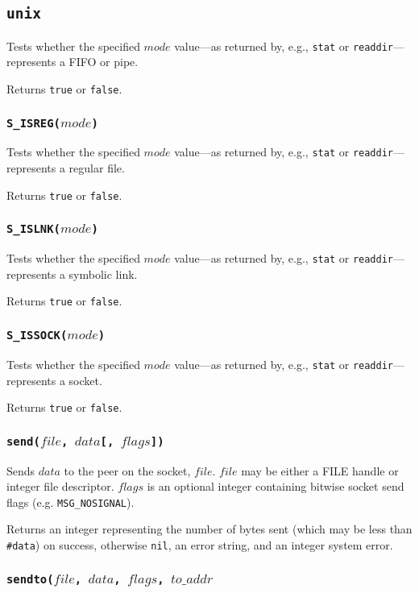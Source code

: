 \documentclass[11pt, oneside]{memoir}
\newcommand*{\true}[0]{\texttt{true}\xspace}
\newcommand*{\false}[0]{\texttt{false}\xspace}
\newcommand*{\nil}[0]{\texttt{nil}\xspace}
\newcommand*{\syscall}[1]{\texttt{#1}\xspace}
\newcommand*{\fn}[1]{\texttt{#1}\xspace}
\newcommand*{\otherwise}[1]{otherwise #1, an error string, and an integer system error}
\newcounter{toccols}
\newenvironment{Module}[1]{
	\subsection{\texttt{#1}}
	\addtocontents{toc}{
		\protect\begin{multicols}{\value{toccols}}
	}
}{
	\addtocontents{toc}{\protect\end{multicols}}
}
\begin{document}
\begin{Module}{unix}
Tests whether the specified $mode$ value---as returned by, e.g., \syscall{stat} or \syscall{readdir}---represents a FIFO or pipe.

Returns \true or \false.

\subsubsection[\fn{S\_ISREG}]{\fn{S\_ISREG($mode$)}}

Tests whether the specified $mode$ value---as returned by, e.g., \syscall{stat} or \syscall{readdir}---represents a regular file.

Returns \true or \false.

\subsubsection[\fn{S\_ISLNK}]{\fn{S\_ISLNK($mode$)}}

Tests whether the specified $mode$ value---as returned by, e.g., \syscall{stat} or \syscall{readdir}---represents a symbolic link.

Returns \true or \false.

\subsubsection[\fn{S\_ISSOCK}]{\fn{S\_ISSOCK($mode$)}}

Tests whether the specified $mode$ value---as returned by, e.g., \syscall{stat} or \syscall{readdir}---represents a socket.

Returns \true or \false.

\subsubsection[\fn{send}]{\fn{send($file$, $data$[, $flags$])}}

Sends $data$ to the peer on the socket, $file$. $file$ may be either a FILE handle or integer file descriptor. $flags$ is an optional integer containing bitwise socket send flags (e.g. \texttt{MSG\_NOSIGNAL}).

Returns an integer representing the number of bytes sent (which may be less than \texttt{\#data}) on success, \otherwise{\nil}.

\subsubsection[\fn{sendto}]{\fn{sendto($file$, $data$, $flags$, $to\_addr$}}


\end{Module}
\end{document}
